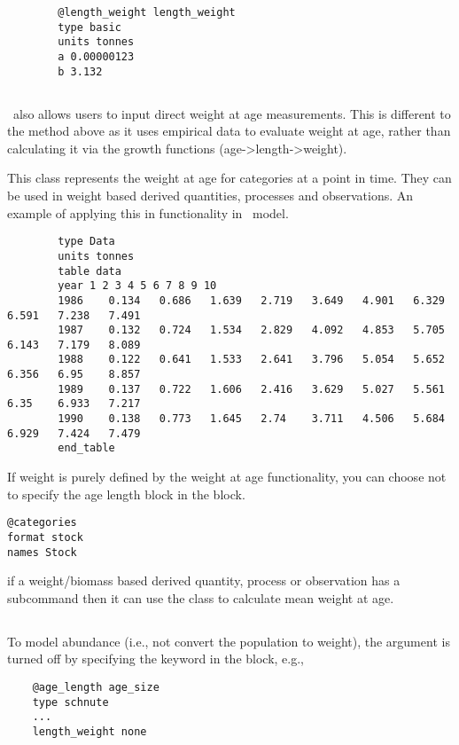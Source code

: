 {\small{\begin{verbatim}
		@length_weight length_weight
		type basic
		units tonnes
		a 0.00000123
		b 3.132
\end{verbatim}}}

\subsection{\label{sec:weight-at-age}}

\CNAME\ also allows users to input direct weight at age measurements. This is different to the method above as it uses empirical data to evaluate weight at age, rather than calculating it via the growth functions (age->length->weight). 

This class represents the weight at age for categories at a point in time. They can be used in weight based derived quantities, processes and observations. An example of applying this in functionality in \CNAME\ model.

{\small{\begin{verbatim}
		type Data
		units tonnes
		table data
		year 1 2 3 4 5 6 7 8 9 10
		1986	0.134	0.686	1.639	2.719	3.649	4.901	6.329	6.591	7.238	7.491
		1987	0.132	0.724	1.534	2.829	4.092	4.853	5.705	6.143	7.179	8.089
		1988	0.122	0.641	1.533	2.641	3.796	5.054	5.652	6.356	6.95	8.857
		1989	0.137	0.722	1.606	2.416	3.629	5.027	5.561	6.35	6.933	7.217
		1990	0.138	0.773	1.645	2.74	3.711	4.506	5.684	6.929	7.424	7.479
		end_table
		\end{verbatim}}}
	
If weight is purely defined by the weight at age functionality, you can choose not to specify the age length block in the  block.

{\small{\begin{verbatim}
@categories 
format stock
names Stock
\end{verbatim}}}

if a weight/biomass based derived quantity, process or observation has a  subcommand then it can use the  class to calculate mean weight at age.

\subsection{\label{sec:weightless-model}}

To model abundance (i.e., not convert the population to weight), the  argument is turned off by specifying the keyword  in the  block, e.g.,
{\small{\begin{verbatim}
	@age_length age_size
	type schnute
	...
	length_weight none
	\end{verbatim}}}

